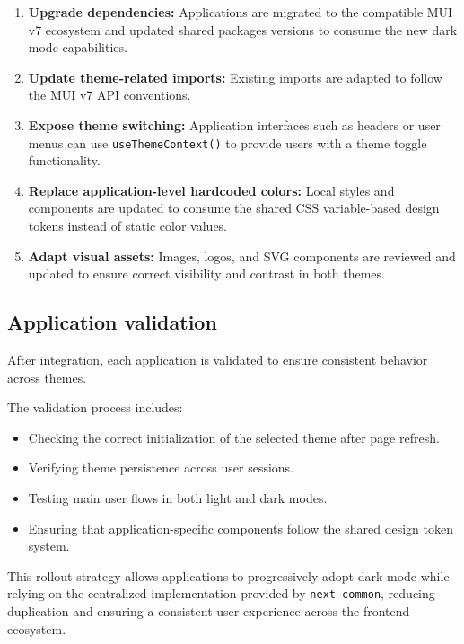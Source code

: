 \begin{enumerate}
    \item \textbf{Upgrade dependencies:} Applications are migrated to the compatible MUI v7 ecosystem and updated shared packages versions to consume the new dark mode capabilities.

    \item \textbf{Update theme-related imports:} Existing imports are adapted to follow the MUI v7 API conventions.

    \item \textbf{Expose theme switching:} Application interfaces such as headers or user menus can use \lstinline|useThemeContext()| to provide users with a theme toggle functionality.

    \item \textbf{Replace application-level hardcoded colors:} Local styles and components are updated to consume the shared CSS variable-based design tokens instead of static color values.

    \item \textbf{Adapt visual assets:} Images, logos, and SVG components are reviewed and updated to ensure correct visibility and contrast in both themes.
\end{enumerate}


\subsection{Application validation}

After integration, each application is validated to ensure consistent behavior across themes.

The validation process includes:

\begin{itemize}
    \item Checking the correct initialization of the selected theme after page refresh.
    \item Verifying theme persistence across user sessions.
    \item Testing main user flows in both light and dark modes.
    \item Ensuring that application-specific components follow the shared design token system.
\end{itemize}

This rollout strategy allows applications to progressively adopt dark mode while relying on the centralized implementation provided by \texttt{next-common}, reducing duplication and ensuring a consistent user experience across the frontend ecosystem.

